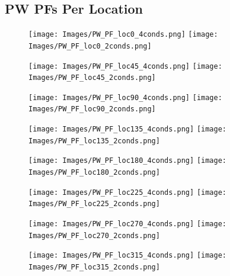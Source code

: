 \documentclass[11pt]{article} %
\begin{document}
\subsection{PW PFs Per Location}
\begin{figure}[H]
\centering %
\texttt{[image: Images/PW\_PF\_loc0\_4conds.png]}
\texttt{[image: Images/PW\_PF\_loc0\_2conds.png]}
\end{figure}
\begin{figure}[H]
\centering %
\texttt{[image: Images/PW\_PF\_loc45\_4conds.png]}
\texttt{[image: Images/PW\_PF\_loc45\_2conds.png]}
\end{figure}
\begin{figure}[H]
\centering %
\texttt{[image: Images/PW\_PF\_loc90\_4conds.png]}
\texttt{[image: Images/PW\_PF\_loc90\_2conds.png]}
\end{figure}
\begin{figure}[H]
\centering %
\texttt{[image: Images/PW\_PF\_loc135\_4conds.png]}
\texttt{[image: Images/PW\_PF\_loc135\_2conds.png]}
\end{figure}
\begin{figure}[H]
\centering %
\texttt{[image: Images/PW\_PF\_loc180\_4conds.png]}
\texttt{[image: Images/PW\_PF\_loc180\_2conds.png]}
\end{figure}
\begin{figure}[H]
\centering %
\texttt{[image: Images/PW\_PF\_loc225\_4conds.png]}
\texttt{[image: Images/PW\_PF\_loc225\_2conds.png]}
\end{figure}
\begin{figure}[H]
\centering %
\texttt{[image: Images/PW\_PF\_loc270\_4conds.png]}
\texttt{[image: Images/PW\_PF\_loc270\_2conds.png]}
\end{figure}
\begin{figure}[H]
\centering %
\texttt{[image: Images/PW\_PF\_loc315\_4conds.png]}
\texttt{[image: Images/PW\_PF\_loc315\_2conds.png]}
\end{figure}

\newpage
\end{document}
